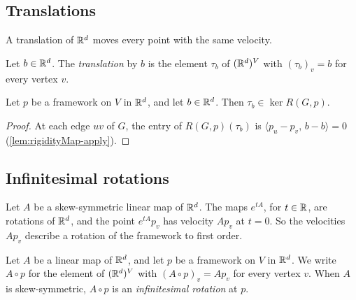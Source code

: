 \subsection{Translations}

A translation of ${\mathbb{R}}^{d}$ moves every point with the same velocity.

\begin{definition}
  \label{def:translationMotion}
  \leanok
  Let $b \in {\mathbb{R}}^{d}$. The \emph{translation} by $b$ is the element
  $\tau_b$ of $({\mathbb{R}}^{d})^{V}$ with $(\tau_b)_v = b$ for every vertex
  $v$.
\end{definition}

\begin{lemma}
  \label{lem:translationMotion-mem-ker}
  \leanok
  Let $p$ be a framework on $V$ in ${\mathbb{R}}^{d}$, and let $b \in {\mathbb{R}}^{d}$.
  Then $\tau_b \in \ker R(G, p)$.
\end{lemma}
\begin{proof}
  \leanok
  At each edge $uv$ of $G$, the entry of $R(G, p)(\tau_b)$ is
  $\langle p_u - p_v,\, b - b \rangle = 0$
  (\cref{lem:rigidityMap-apply}).
\end{proof}

\subsection{Infinitesimal rotations}

Let $A$ be a skew-symmetric linear map of ${\mathbb{R}}^{d}$. The maps
$e^{tA}$, for $t \in {\mathbb{R}}$, are rotations of ${\mathbb{R}}^{d}$, and the point
$e^{tA} p_v$ has velocity $A p_v$ at $t = 0$. So the velocities
$A p_v$ describe a rotation of the framework to first order.

\begin{definition}
  \label{def:infinitesimalRotation}
  \leanok
  Let $A$ be a linear map of ${\mathbb{R}}^{d}$, and let $p$ be a framework on
  $V$ in ${\mathbb{R}}^{d}$. We write $A \circ p$ for the element of
  $({\mathbb{R}}^{d})^{V}$ with $(A \circ p)_v = A p_v$ for every vertex $v$.
  When $A$ is skew-symmetric, $A \circ p$ is an \emph{infinitesimal
  rotation} at $p$.
\end{definition}

